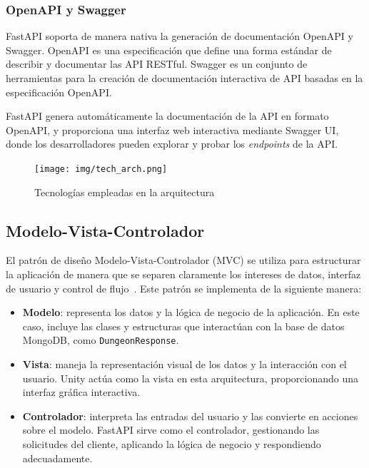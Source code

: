 \subsubsection{OpenAPI y Swagger}

FastAPI soporta de manera nativa la generación de documentación OpenAPI y Swagger. OpenAPI es una especificación que define una forma estándar de describir y documentar las API RESTful. Swagger es un conjunto de herramientas para la creación de documentación interactiva de API basadas en la especificación OpenAPI.

FastAPI genera automáticamente la documentación de la API en formato OpenAPI, y proporciona una interfaz web interactiva mediante Swagger UI, donde los desarrolladores pueden explorar y probar los \textit{endpoints} de la API.

\vspace{1em}

\begin{figure}[H]
    \centering
    \texttt{[image: img/tech\_arch.png]} %
    \caption{Tecnologías empleadas en la arquitectura}
    \label{fig:enter-label}
\end{figure}


\subsection{Modelo-Vista-Controlador}

El patrón de diseño Modelo-Vista-Controlador (MVC) se utiliza para estructurar la aplicación de manera que se separen claramente los intereses de datos, interfaz de usuario y control de flujo~\cite{mvc}. Este patrón se implementa de la siguiente manera:

\begin{itemize}
    \item \textbf{Modelo}: representa los datos y la lógica de negocio de la aplicación. En este caso, incluye las clases y estructuras que interactúan con la base de datos MongoDB, como \texttt{DungeonResponse}.
    \item \textbf{Vista}: maneja la representación visual de los datos y la interacción con el usuario. Unity actúa como la vista en esta arquitectura, proporcionando una interfaz gráfica interactiva.
    \item \textbf{Controlador}: interpreta las entradas del usuario y las convierte en acciones sobre el modelo. FastAPI sirve como el controlador, gestionando las solicitudes del cliente, aplicando la lógica de negocio y respondiendo adecuadamente.
\end{itemize}

